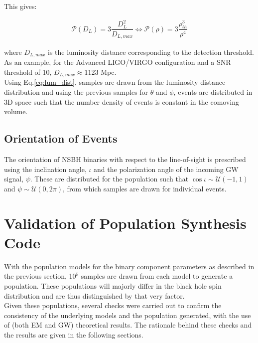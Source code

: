         This gives:

        \begin{align}
            \label{eq:lum_dist}
            \mathcal{P}(D_L) = 3 \dfrac{D_L^2}{D_{L, max}}
                                 \Leftrightarrow
            \mathcal{P}(\rho) = 3 \dfrac{\rho_{th}^3}{\rho^4}
        \end{align}

        where $D_{L, max}$ is the luminosity distance corresponding to the detection
        threshold. As an example, for the Advanced LIGO/VIRGO configuration and a SNR
        threshold of 10, $D_{L, max} \approx 1123$ Mpc.\\
        Using Eq.\ref{eq:lum_dist}, samples are drawn from the luminosity distance
        distribution and using the previous samples for $\theta$ and $\phi$, events are
        distributed in 3D space such that the number density of events is constant in
        the comoving volume.

    \subsection{Orientation of Events}\label{sub:orientation_of_events}

        The orientation of NSBH binaries with respect to the line-of-sight is prescribed
        using the inclination angle, $\iota$ and the polarization angle of the incoming
        GW signal, $\psi$. These are distributed for the population such that $\cos\iota
        \sim \mathcal{U}(-1, 1)$ and $\psi \sim \mathcal{U}(0, 2\pi)$, from which
        samples are drawn for individual events.

\section{Validation of Population Synthesis Code}\label{sec:popsyn_validation}

    With the population models for the binary component parameters as described in the
    previous section, 10$^5$ samples are drawn from each model to generate a population.
    These populations will majorly differ in the black hole spin distribution and are
    thus distinguished by that very factor.\\
    Given these populations, several checks were carried out to confirm the consistency
    of the underlying models and the population generated, with the use of (both EM and
    GW) theoretical results. The rationale behind these checks and the results are given
    in the following sections.

